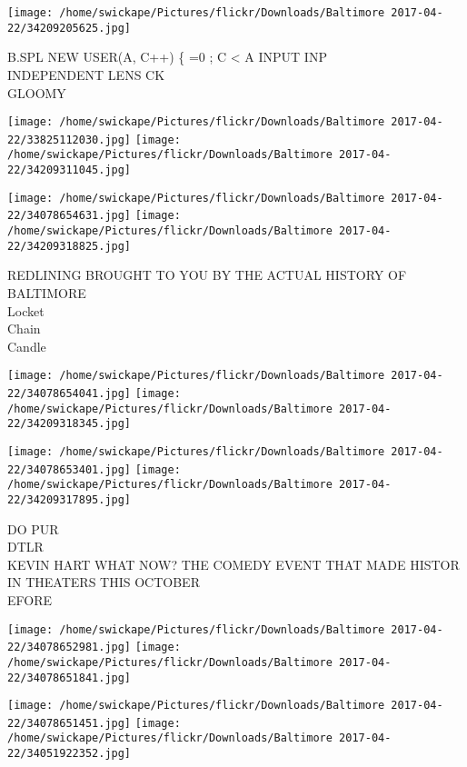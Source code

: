 \documentclass[10pt,letterpaper]{article}
\begin{document}
\vspace{0.25in}
\texttt{[image: /home/swickape/Pictures/flickr/Downloads/Baltimore 2017-04-22/34209205625.jpg]}

B.SPL NEW USER(A,  C++)  \{   =0 ; C < A INPUT INP\\
INDEPENDENT LENS CK\\
GLOOMY\\
\pagebreak

\texttt{[image: /home/swickape/Pictures/flickr/Downloads/Baltimore 2017-04-22/33825112030.jpg]}
\texttt{[image: /home/swickape/Pictures/flickr/Downloads/Baltimore 2017-04-22/34209311045.jpg]}

\texttt{[image: /home/swickape/Pictures/flickr/Downloads/Baltimore 2017-04-22/34078654631.jpg]}
\texttt{[image: /home/swickape/Pictures/flickr/Downloads/Baltimore 2017-04-22/34209318825.jpg]}

REDLINING BROUGHT TO YOU BY THE ACTUAL HISTORY OF BALTIMORE\\
Locket\\
Chain\\
Candle\\
\pagebreak

\texttt{[image: /home/swickape/Pictures/flickr/Downloads/Baltimore 2017-04-22/34078654041.jpg]}
\texttt{[image: /home/swickape/Pictures/flickr/Downloads/Baltimore 2017-04-22/34209318345.jpg]}

\texttt{[image: /home/swickape/Pictures/flickr/Downloads/Baltimore 2017-04-22/34078653401.jpg]}
\texttt{[image: /home/swickape/Pictures/flickr/Downloads/Baltimore 2017-04-22/34209317895.jpg]}

DO PUR\\
DTLR\\
KEVIN HART WHAT NOW?  THE COMEDY EVENT THAT MADE HISTOR IN THEATERS THIS OCTOBER\\
EFORE\\
\pagebreak

\texttt{[image: /home/swickape/Pictures/flickr/Downloads/Baltimore 2017-04-22/34078652981.jpg]}
\texttt{[image: /home/swickape/Pictures/flickr/Downloads/Baltimore 2017-04-22/34078651841.jpg]}

\texttt{[image: /home/swickape/Pictures/flickr/Downloads/Baltimore 2017-04-22/34078651451.jpg]}
\texttt{[image: /home/swickape/Pictures/flickr/Downloads/Baltimore 2017-04-22/34051922352.jpg]}
\end{document}
